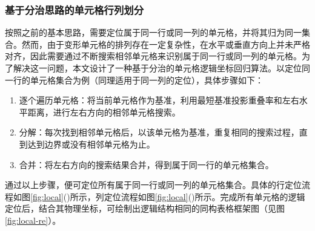 \documentclass[UTF8,12pt, AutoFakeBold,fontset = founder]{ctexart}
\begin{document}
\subsubsection{基于分治思路的单元格行列划分}

按照之前的基本思路，需要定位属于同一行或同一列的单元格，并将其归为同一集合。然而，由于变形单元格的排列存在一定复杂性，在水平或垂直方向上并未严格对齐，因此需要通过不断搜索相邻单元格来识别属于同一行或同一列的单元格。为了解决这一问题，本文设计了一种基于分治的单元格逻辑坐标回归算法。以定位同一行的单元格集合为例（同理适用于同一列的定位），具体步骤如下：

\begin{enumerate}[label=(\arabic*), leftmargin=40pt]
    \item 逐个遍历单元格：将当前单元格作为基准，利用最短基准投影重叠率和左右水平距离，进行左右方向的相邻单元格搜索。
    \item 分解：每次找到相邻单元格后，以该单元格为基准，重复相同的搜索过程，直到达到边界或没有相邻单元格为止。
    \item 合并：将左右方向的搜索结果合并，得到属于同一行的单元格集合。
\end{enumerate}

通过以上步骤，便可定位所有属于同一行或同一列的单元格集合。具体的行定位流程如图\ref{fig:local}()所示，列定位流程如图\ref{fig:local}()所示。完成所有单元格的逻辑定位后，结合其物理坐标，可绘制出逻辑结构相同的同构表格框架图（见图\ref{fig:local-re}）。
\end{document}
